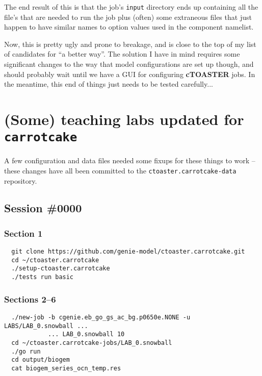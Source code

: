 \documentclass[a4paper,10pt,article]{memoir}
\begin{document}
The end result of this is that the job's \texttt{input} directory ends
up containing all the file's that are needed to run the job plus
(often) some extraneous files that just happen to have similar names
to option values used in the component namelist.

Now, this is pretty ugly and prone to breakage, and is close to the
top of my list of candidates for ``a better way''.  The solution I
have in mind requires some significant changes to the way that model
configurations are set up though, and should probably wait until we
have a GUI for configuring \textbf{cTOASTER} jobs.  In the meantime, this end of
things just needs to be tested carefully...

\newpage

\appendix
\chapter{(Some) teaching labs updated for \texttt{carrotcake}}

A few configuration and data files needed some fixups for these things
to work -- these changes have all been committed to the
\texttt{ctoaster.carrotcake-data} repository.

\section{Session \#0000}

\subsection*{Section 1}

\begin{verbatim}
  git clone https://github.com/genie-model/ctoaster.carrotcake.git
  cd ~/ctoaster.carrotcake
  ./setup-ctoaster.carrotcake
  ./tests run basic
\end{verbatim}

\subsection*{Sections 2--6}

\begin{verbatim}
  ./new-job -b cgenie.eb_go_gs_ac_bg.p0650e.NONE -u LABS/LAB_0.snowball ...
            ... LAB_0.snowball 10
  cd ~/ctoaster.carrotcake-jobs/LAB_0.snowball
  ./go run
  cd output/biogem
  cat biogem_series_ocn_temp.res
\end{verbatim}
\end{document}
